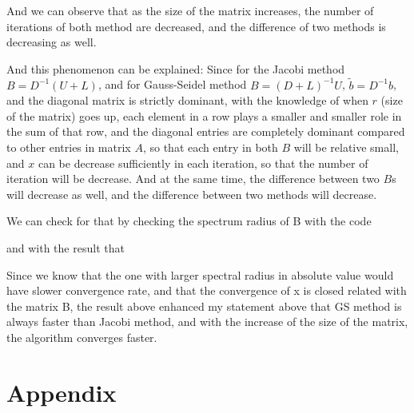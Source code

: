 \documentclass{article}
\begin{document}
   And we can observe that as the size of the matrix increases, the number of iterations of both method are decreased, and the difference of two methods is decreasing as well.
   
   And this phenomenon can be explained:   
   Since for the Jacobi method $B = D^{-1}(U+L)$, and for Gauss-Seidel method $B = (D+L)^{-1}U$,  $\tilde{b} = D^{-1}b$, and the diagonal matrix is strictly dominant, with the knowledge of when $r$ (size of the matrix) goes up, each element in a row plays a smaller and smaller role in the sum of that row, and the diagonal entries are completely dominant compared to other entries in matrix $A$, so that each entry in both $B$ will be relative small, and $x$ can be decrease sufficiently in each iteration, so that the number of iteration will be decrease. And at the same time, the difference between two $B$s will decrease as well, and the difference between two methods will decrease.

We can check for that by checking the spectrum radius of B with the code


and with the result that 

Since we know that the one with larger spectral radius in absolute value would have slower convergence rate, and that the convergence of x is closed related with the matrix B, the result above enhanced my statement above that GS method is always faster than Jacobi method, and with the increase of the size of the matrix, the algorithm converges faster.
\section{Appendix}


\end{document}
